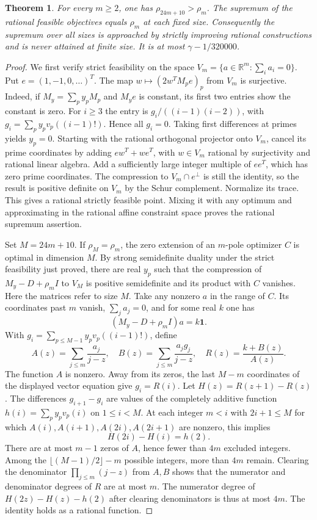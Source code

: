 \documentclass[11pt,a4paper,oneside,openany]{report}
\newtheorem{theorem}{Theorem}[section]
\theoremstyle{remark}\newtheorem{remark}[theorem]{Remark}
\numberwithin{equation}{section}
\begin{document}
\begin{theorem}\label{ch3:st:psdgrowth}
For every $m\ge2$, one has $\rho_{24m+10}>\rho_m$. The supremum of
the rational feasible objectives equals $\rho_m$ at each fixed size.
Consequently the supremum over all sizes is approached by strictly
improving rational constructions and is never attained at finite size.
It is at most $\gamma-1/320000$.
\end{theorem}
\begin{proof}
We first verify strict feasibility on the space
$V_m=\{a\in\mathbb R^m:\sum_i a_i=0\}$. Put $e=(1,-1,0,\ldots)^T$.
The map $w\mapsto(2w^TM_pe)_p$ from $V_m$ is surjective. Indeed,
if $M_y=\sum_p y_p M_p$ and $M_y e$ is constant, its first two entries
show the constant is zero. For $i\ge3$ the entry is
$g_i/((i-1)(i-2))$, with $g_i=\sum_p y_p v_p((i-1)!)$.
Hence all $g_i=0$. Taking first differences at primes yields $y_p=0$.
Starting with the rational orthogonal projector onto $V_m$, cancel its
prime coordinates by adding $e w^T+w e^T$, with $w\in V_m$ rational
by surjectivity and rational linear algebra. Add a sufficiently large
integer multiple of $ee^T$, which has zero prime coordinates. The
compression to $V_m\cap e^\perp$ is still the identity, so the result
is positive definite on $V_m$ by the Schur complement. Normalize its
trace. This gives a rational strictly feasible point. Mixing it with
any optimum and approximating in the rational affine constraint space
proves the rational supremum assertion.

Set $M=24m+10$. If $\rho_M=\rho_m$, the zero extension of an $m$-pole
optimizer $C$ is optimal in dimension $M$. By strong semidefinite
duality under the strict feasibility just proved, there are real $y_p$
such that the compression of $M_y-D+\rho_m I$ to $V_M$ is positive
semidefinite and its product with $C$ vanishes. Here the matrices refer
to size $M$. Take any nonzero $a$ in the range of $C$. Its coordinates
past $m$ vanish, $\sum_j a_j=0$, and for some real $k$ one has
\[
                 (M_y-D+\rho_m I)a=k\mathbf 1 .
\]
With $g_i=\sum_{p\le M-1}y_p v_p((i-1)!)$, define
\[
 A(z)=\sum_{j\le m}\frac{a_j}{j-z},\quad
 B(z)=\sum_{j\le m}\frac{a_jg_j}{j-z},\quad R(z)=\frac{k+B(z)}{A(z)} .
\]
The function $A$ is nonzero. Away from its zeros, the last $M-m$
coordinates of the displayed vector equation give $g_i=R(i)$.
Let $H(z)=R(z+1)-R(z)$. The differences $g_{i+1}-g_i$ are values of
the completely additive function $h(i)=\sum_p y_p v_p(i)$ on
$1\le i<M$. At each integer $m<i$ with $2i+1\le M$ for which
$A(i),A(i+1),A(2i),A(2i+1)$ are nonzero, this implies
\[
                    H(2i)-H(i)=h(2).
\]
There are at most $m-1$ zeros of $A$, hence fewer than $4m$
excluded integers. Among the $\lfloor(M-1)/2\rfloor-m$
possible integers, more than $4m$ remain. Clearing the denominator
$\prod_{j\le m}(j-z)$ from $A,B$ shows that the numerator and
denominator degrees of $R$ are at most $m$. The numerator degree of
$H(2z)-H(z)-h(2)$ after clearing denominators is thus at most $4m$.
The identity holds as a rational function.


\end{proof}
\end{document}
